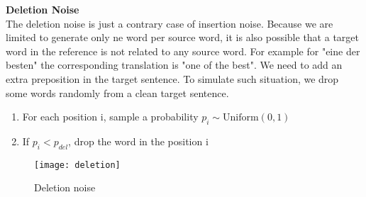 	




	\textbf{Deletion Noise}\\
	The deletion noise is just a contrary case of insertion noise.
	Because we are limited to generate only ne word per source word, it is also possible that a target word in the reference is not related to any source word.  For example for "eine der besten" the corresponding translation is "one of the best". We need to add an extra preposition in the target sentence.  To simulate such situation, we drop some words randomly from a clean target sentence.
	
	\begin{enumerate}
		\item For each position i, sample a probability ${p_i \sim \textrm{Uniform}(0,1)}$
		\item If ${p_i} < p_{del}$, drop the word in the position i
	\end{enumerate}
	
		\begin{figure}[h]
		\texttt{[image: deletion]}
		\caption{ Deletion noise}
		\centering
	\end{figure}

	
	
	
	
	
	
	
	
	
	
	
	
	
	
	
	
	
	
	
	
	
	
	
	
	
	
	
	
